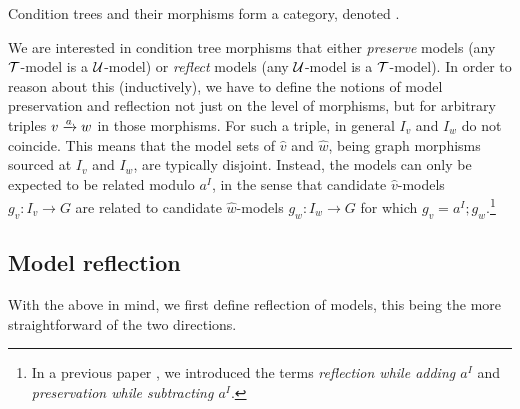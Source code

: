 \begin{proposition}
Condition trees and their morphisms form a category, denoted {\CT}.
\end{proposition}
%
We are interested in condition tree morphisms that either \emph{preserve} models (any ${\mathcal{T}}$-model is a ${\mathcal{U}}$-model) or \emph{reflect} models (any ${\mathcal{U}}$-model is a ${\mathcal{T}}$-model). In order to reason about this (inductively), we have to define the notions of model preservation and reflection not just on the level of morphisms, but for arbitrary triples $\trip vaw$ in those morphisms. For such a triple, in general $I_v$ and $I_w$ do not coincide. This means that the model sets of $\hat v$ and $\hat w$, being graph morphisms sourced at $I_v$ and $I_w$, are typically disjoint. Instead, the models can only be expected to be related modulo $a^I$, in the sense that candidate $\hat v$-models $g_v:I_v\to G$ are related to candidate $\hat w$-models $g_w:I_w\to G$ for which $g_v=a^I;g_w$.\footnote{In a previous paper \cite{RensCorr}, we introduced the terms \emph{reflection while adding $a^I$} and \emph{preservation while subtracting $a^I$}.}

\subsection{Model reflection}

With the above in mind, we first define reflection of models, this being the more straightforward of the two directions.


